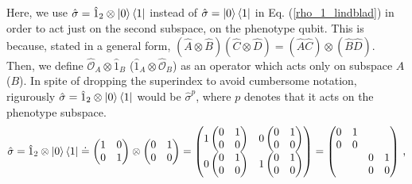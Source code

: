 \documentclass[11pt]{article}
\numberwithin{equation}{section} %
\numberwithin{figure}{section} %
\begin{document}
\begin{appendices}
\subsection{} \label{lindbladian_calculations}
Here, we use $\hat{\sigma}=\hat{1}_2\otimes\ket{0}\bra{1}$ instead of $\hat{\sigma}=\ket{0}\bra{1}$ in Eq. (\ref{rho_1_lindblad}) in order to act just on the second subspace, on the phenotype qubit. This is because, stated in a general form, $(\hat{A}\otimes\hat{B})(\hat{C}\otimes\hat{D})=(\hat{A}\hat{C})\otimes(\hat{B}\hat{D})$. Then, we define $\hat{\mathcal{O}}_A\otimes\hat{1}_B$ ($\hat{1}_A\otimes\hat{\mathcal{O}}_B$) as an operator which acts only on subspace $A$ ($B$). In spite of dropping the superindex to avoid cumbersome notation, rigurously $\hat{\sigma}=\hat{1}_2\otimes\ket{0}\bra{1}$ would be $\hat{\sigma}^p$, where $p$ denotes that it acts on the phenotype subspace.
\begin{equation}
\hat{\sigma}=\hat{1}_2\otimes\ket{0}\bra{1}\doteq \begin{pmatrix}1&0\\0&1\end{pmatrix}\otimes\begin{pmatrix}0&1\\0&0\end{pmatrix}=\begin{pmatrix}1\begin{pmatrix}0&1\\0&0\end{pmatrix}&0\begin{pmatrix}0&1\\0&0\end{pmatrix}\\0\begin{pmatrix}0&1\\0&0\end{pmatrix}&1\begin{pmatrix}0&1\\0&0\end{pmatrix}\end{pmatrix}=\begin{pmatrix}0&1&&\\0&0&&\\&&0&1\\&&0&0\end{pmatrix}\,\textrm{,}
\end{equation}
\begin{equation} \label{sigma_dagger}

\end{equation}
\end{appendices}
\end{document}
